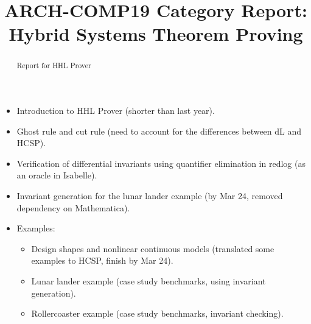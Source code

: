 \documentclass[runningheads,a4paper]{llncs}
\begin{document}
\author{}
\institute{}

\title{ARCH-COMP19 Category Report: Hybrid Systems Theorem Proving}

\maketitle

\begin{abstract}
  Report for HHL Prover
\end{abstract}


\begin{itemize}
\item Introduction to HHL Prover (shorter than last year).
\item Ghost rule and cut rule (need to account for the differences
  between dL and HCSP).
\item Verification of differential invariants using quantifier
  elimination in redlog (as an oracle in Isabelle).
\item Invariant generation for the lunar lander example (by Mar 24,
  removed dependency on Mathematica).
\item Examples:
  \begin{itemize}
  \item Design shapes and nonlinear continuous models (translated some
    examples to HCSP, finish by Mar 24).
  \item Lunar lander example (case study benchmarks, using invariant
    generation).
  \item Rollercoaster example (case study benchmarks, invariant
    checking).
  \end{itemize}
\end{itemize}



\end{document}
